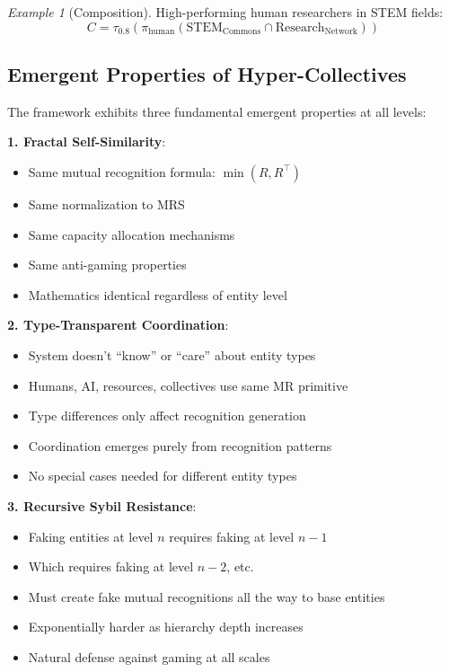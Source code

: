 \documentclass[11pt,a4paper]{article}
\theoremstyle{definition}
\theoremstyle{remark}
\newtheorem{example}[theorem]{Example}
\begin{document}
\begin{example}[Composition]
High-performing human researchers in STEM fields:
\[ C = \tau_{0.8}(\pi_{\text{human}}(\text{STEM}_\text{Commons} \cap \text{Research}_\text{Network})) \]
\end{example}

\subsection{Emergent Properties of Hyper-Collectives}

The framework exhibits three fundamental emergent properties at all levels:

\textbf{1. Fractal Self-Similarity}:
\begin{itemize}
\item Same mutual recognition formula: $\min(R, R^\top)$
\item Same normalization to MRS
\item Same capacity allocation mechanisms
\item Same anti-gaming properties
\item Mathematics identical regardless of entity level
\end{itemize}

\textbf{2. Type-Transparent Coordination}:
\begin{itemize}
\item System doesn't ``know'' or ``care'' about entity types
\item Humans, AI, resources, collectives use same MR primitive
\item Type differences only affect recognition generation
\item Coordination emerges purely from recognition patterns
\item No special cases needed for different entity types
\end{itemize}

\textbf{3. Recursive Sybil Resistance}:
\begin{itemize}
\item Faking entities at level $n$ requires faking at level $n-1$
\item Which requires faking at level $n-2$, etc.
\item Must create fake mutual recognitions all the way to base entities
\item Exponentially harder as hierarchy depth increases
\item Natural defense against gaming at all scales
\end{itemize}
\end{document}
